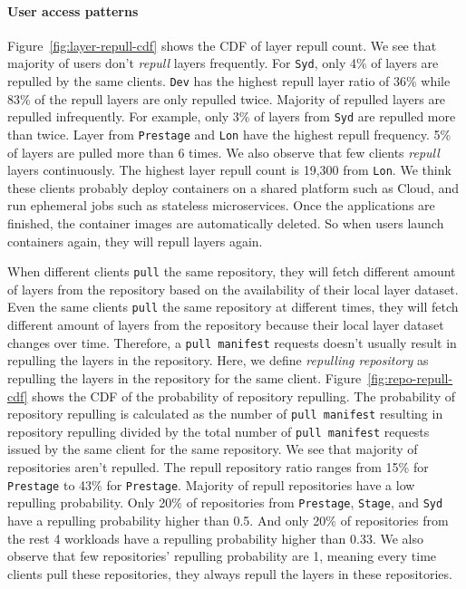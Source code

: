 \paragraph{User access patterns}
Figure~\ref{fig:layer-repull-cdf} shows the CDF of layer repull count.
We see that majority of users don't \emph{repull} layers frequently.
For \texttt{Syd}, only 4\% of layers are repulled by the same clients.
\texttt{Dev} has the highest repull layer ratio of 36\% while 83\% of the repull layers are only repulled twice.
Majority of repulled layers are repulled infrequently.
For example, only 3\% of layers from \texttt{Syd} are repulled more than twice.
Layer from \texttt{Prestage} and \texttt{Lon} have the highest repull frequency.
5\% of layers are pulled more than 6 times.
We also observe that few clients \emph{repull} layers continuously.
The highest layer repull count is 19,300 from \texttt{Lon}.
We think these clients probably deploy containers on a shared platform such as Cloud,
and run ephemeral jobs such as stateless microservices. 
Once the applications are finished, the container images are automatically deleted.
So when users launch containers again, they will repull layers again.

When different clients \texttt{pull} the same repository, 
they will fetch different amount of layers from the repository based on the availability of their local layer dataset.
Even the same clients \texttt{pull} the same repository at different times, 
they will fetch different amount of layers from the repository because their local layer dataset changes over time.
Therefore, a \texttt{pull manifest} requests doesn't usually result in repulling the layers in the repository. 
Here, we define \emph{repulling repository} as 
repulling the layers in the repository for the same client.
Figure~\ref{fig:repo-repull-cdf} shows the CDF of the probability of repository repulling.
The probability of repository repulling is calculated 
as the number of \texttt{pull manifest} resulting in repository repulling divided by 
the total number of \texttt{pull manifest} requests issued by the same client for the same repository.
We see that majority of repositories aren't repulled.
The repull repository ratio ranges from 15\% for \texttt{Prestage} to 43\% for \texttt{Prestage}.
Majority of repull repositories have a low repulling probability.
Only 20\% of repositories from  \texttt{Prestage}, \texttt{Stage}, and 
\texttt{Syd} have a repulling probability higher than 0.5.
And only 20\% of repositories from the rest 4 workloads have a repulling probability higher than 0.33.
We also observe that few repositories' repulling probability are 1, meaning 
every time clients pull these repositories, they always repull the layers in these repositories. 
 
